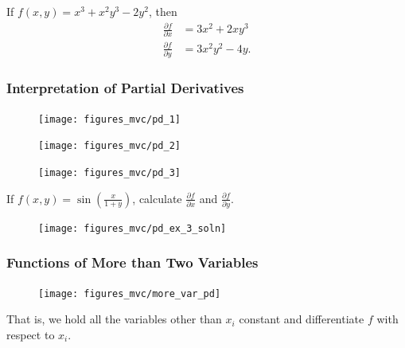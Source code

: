 \documentclass[12pt,letterpaper,reqno]{article}
\numberwithin{equation}{section}
\newcommand{\fixme}[1]{{\color{orange}{[#1]}}}
\begin{document}
{\begin{example}
If $f(x,y)=x^3+x^2y^3-2y^2$, then
\begin{align*}
	\frac{\partial f}{\partial x}&=3x^2+2xy^3 \\
	\frac{\partial f}{\partial y}&=3x^2y^2-4y.
\end{align*}	
\end{example}
\newpage

\subsubsection{Interpretation of Partial Derivatives}

\begin{figure}[h]
	\begin{center}
		\texttt{[image: figures\_mvc/pd\_1]}
	\end{center}
\end{figure}

\begin{figure}[h]
	\begin{center}
		\texttt{[image: figures\_mvc/pd\_2]}
	\end{center}
\end{figure}

\begin{figure}[h]
	\begin{center}
		\texttt{[image: figures\_mvc/pd\_3]}
	\end{center}
\end{figure}
\newpage 
\begin{exercise}
If $f(x,y)=\sin\left(\frac{x}{1+y}\right)$, calculate $\frac{\partial f}{\partial x}$ and $\frac{\partial f}{\partial y}$.
\end{exercise}

\begin{figure}[h]
	\begin{center}
		\texttt{[image: figures\_mvc/pd\_ex\_3\_soln]}
	\end{center}
\end{figure}

\fixme{More Examples?}

\fixme{Implicit differentiation here?}
\newpage 
\subsubsection{Functions of More than Two Variables}
\begin{figure}[h]
	\begin{center}
		\texttt{[image: figures\_mvc/more\_var\_pd]}
	\end{center}
\end{figure}
That is, we hold all the variables other than $x_i$ constant and differentiate $f$ with respect to $x_i$.

}
\end{document}
